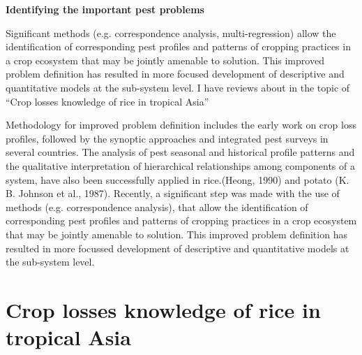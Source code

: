 

\textbf{Identifying the important pest problems}


Significant methods (e.g. correspondence analysis, multi-regression) allow the identification of corresponding pest profiles and patterns of cropping practices in a crop ecosystem that may be jointly amenable to solution. This improved problem definition has resulted in more focused development of descriptive and quantitative models at the sub-system level. I have reviews about in the topic of ``Crop losses knowledge of rice in tropical Asia''



Methodology for improved problem definition includes the early work on crop loss profiles, followed by the synoptic approaches and integrated
pest surveys in several countries. The analysis of pest seasonal and historical profile patterns and the qualitative interpretation of hierarchical relationships among components of a system, have also been successfully applied in rice.(Heong, 1990) and potato (K. B. Johnson et al., 1987). Recently, a significant step was made with the use of methods (e.g. correspondence analysis), that allow the identification of corresponding pest profiles and patterns of cropping practices in a crop ecosystem that may be jointly amenable to solution. This improved problem definition has resulted in more focussed development of descriptive and quantitative models at the sub-system level.

\section*{Crop losses knowledge of rice in tropical Asia}

